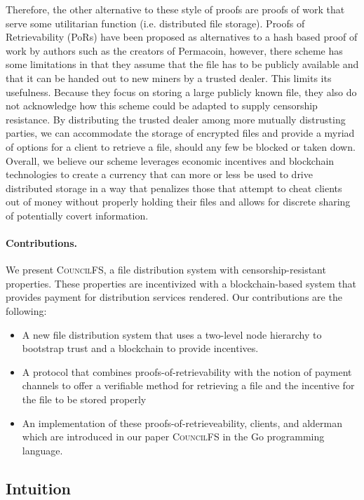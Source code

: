 \documentclass{article}
\begin{document}
Therefore, the other alternative to these style of proofs are proofs of
work that serve some utilitarian function (i.e. distributed file storage).
Proofs of Retrievability (PoRs) have been proposed as alternatives to a hash
based proof of work by authors such as the creators of Permacoin, however, there
scheme has some limitations in that they assume that the file has to be publicly
available and that it can be handed out to new miners by a trusted dealer. This
limits its usefulness. Because they focus on storing a large publicly known
file, they also do not acknowledge how this scheme could be adapted to supply censorship resistance. By distributing the trusted dealer among more
mutually distrusting parties, we can accommodate the storage of encrypted files
and provide a myriad of options for a client to retrieve a file, should any few be
blocked or taken down. Overall, we believe our scheme leverages economic
incentives and blockchain technologies to create a currency that can more or
less be used to drive distributed storage in a way that penalizes those that
attempt to cheat clients out of money without properly holding their files and allows for
discrete sharing of potentially covert information.

\paragraph{Contributions.} We present \textsc{CouncilFS}, a file distribution
system with censorship-resistant properties. These properties are incentivized
with a blockchain-based system that provides payment for distribution services
rendered. Our contributions are the following:
\begin{itemize}
\item A new file distribution system that uses a two-level node hierarchy to
  bootstrap trust and a blockchain to provide incentives.
\item A protocol that combines proofs-of-retrievability with the
  notion of payment channels to offer a verifiable method for retrieving a file and the incentive for the file to be stored properly
\item An implementation of these proofs-of-retrieveability, clients, and alderman
  which are introduced in our paper \textsc{CouncilFS} in the Go programming language.
\end{itemize}

\subsection{Intuition}
\end{document}
